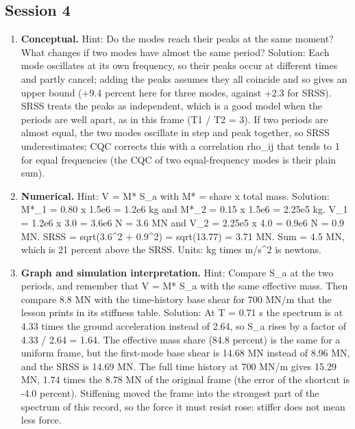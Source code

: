 \documentclass[11pt,a4paper]{article}
\begin{document}
\subsection*{Session 4}
\begin{enumerate}[nosep]
\item \textbf{Conceptual.} Hint: Do the modes reach their peaks at the same moment? What changes if two modes have almost the same period? Solution: Each mode oscillates at its own frequency, so their peaks occur at different times and partly cancel; adding the peaks assumes they all coincide and so gives an upper bound (+9.4 percent here for three modes, against +2.3 for SRSS). SRSS treats the peaks as independent, which is a good model when the periods are well apart, as in this frame (T1 / T2 = 3). If two periods are almost equal, the two modes oscillate in step and peak together, so SRSS underestimates; CQC corrects this with a correlation rho\_ij that tends to 1 for equal frequencies (the CQC of two equal-frequency modes is their plain sum).
\item \textbf{Numerical.} Hint: V = M* S\_a with M* = share x total mass. Solution: M*\_1 = 0.80 x 1.5e6 = 1.2e6 kg and M*\_2 = 0.15 x 1.5e6 = 2.25e5 kg. V\_1 = 1.2e6 x 3.0 = 3.6e6 N = 3.6 MN and V\_2 = 2.25e5 x 4.0 = 0.9e6 N = 0.9 MN. SRSS = sqrt(3.6\textasciicircum{}2 + 0.9\textasciicircum{}2) = sqrt(13.77) = 3.71 MN. Sum = 4.5 MN, which is 21 percent above the SRSS. Units: kg times m/s\textasciicircum{}2 is newtons.
\item \textbf{Graph and simulation interpretation.} Hint: Compare S\_a at the two periods, and remember that V = M* S\_a with the same effective mass. Then compare 8.8 MN with the time-history base shear for 700 MN/m that the lesson prints in its stiffness table. Solution: At T = 0.71 s the spectrum is at 4.33 times the ground acceleration instead of 2.64, so S\_a rises by a factor of 4.33 / 2.64 = 1.64. The effective mass share (84.8 percent) is the same for a uniform frame, but the first-mode base shear is 14.68 MN instead of 8.96 MN, and the SRSS is 14.69 MN. The full time history at 700 MN/m gives 15.29 MN, 1.74 times the 8.78 MN of the original frame (the error of the shortcut is -4.0 percent). Stiffening moved the frame into the strongest part of the spectrum of this record, so the force it must resist rose: stiffer does not mean less force.

\end{enumerate}
\end{document}
